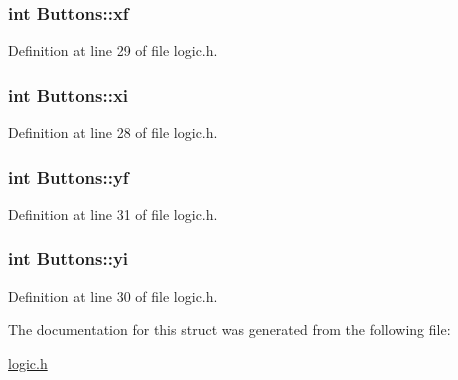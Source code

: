 \subsubsection[{xf}]{\setlength{\rightskip}{0pt plus 5cm}int Buttons\+::xf}\label{struct_buttons_a9eca94a4f9d872c5c24c1224e7d4282a}


Definition at line 29 of file logic.\+h.

\hypertarget{struct_buttons_a2ecf7ff3728004e014316b1abf219616}{}
\subsubsection[{xi}]{\setlength{\rightskip}{0pt plus 5cm}int Buttons\+::xi}\label{struct_buttons_a2ecf7ff3728004e014316b1abf219616}


Definition at line 28 of file logic.\+h.

\hypertarget{struct_buttons_a5b83d4b03c97b941d117a7792858c376}{}
\subsubsection[{yf}]{\setlength{\rightskip}{0pt plus 5cm}int Buttons\+::yf}\label{struct_buttons_a5b83d4b03c97b941d117a7792858c376}


Definition at line 31 of file logic.\+h.

\hypertarget{struct_buttons_a36cc9f309e255a9d7d4a1f65f9179877}{}
\subsubsection[{yi}]{\setlength{\rightskip}{0pt plus 5cm}int Buttons\+::yi}\label{struct_buttons_a36cc9f309e255a9d7d4a1f65f9179877}


Definition at line 30 of file logic.\+h.



The documentation for this struct was generated from the following file\+:\begin{DoxyCompactItemize}
\item 
\hyperlink{logic_8h}{logic.\+h}\end{DoxyCompactItemize}

